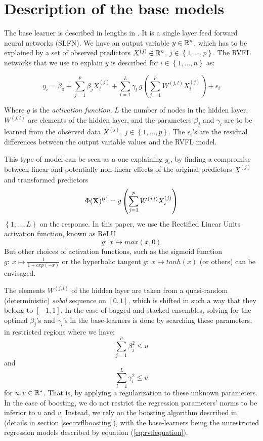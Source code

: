 \section{Description of the base models}
\label{sec:basemodeldesc}

The base learner is described in lengths in \cite{moudiki2018multiple}. It is a single layer feed forward neural networks (SLFN). We have an output variable $y \in \mathbb{R}^n$, which has to be explained by a set of observed predictors $X^{(j)} \in \mathbb{R}^n$, $j \in \left\lbrace 1, \ldots,
p\right\rbrace$. The RVFL networks that we use to explain $y$ is described for $i \in \left\lbrace 1, \ldots, n\right\rbrace$ as:

\begin{equation}
\label{eq:rvflequation}
y_i = \beta_0 + \sum_{j = 1}^p \beta_j X_i^{(j)} + \sum_{l = 1}^L \gamma_l \:
g\left(\sum_{j = 1}^p W^{(j, l)} X_i^{(j)}\right) + \epsilon_i
\end{equation}

\medskip

Where $g$ is the \textit{activation function}, $L$ the number of nodes in the hidden
layer, $W^{(j, l)}$ are elements of the hidden layer, and the parameters
$\beta_j$ and $\gamma_l$ are to be learned from the observed data $X^{(j)}, \: j
\in \left\lbrace 1, \ldots, p\right\rbrace$. The $\epsilon_i$'s are the residual
differences between the output variable values and the RVFL model.

\medskip

This type of model can be seen as a one explaining $y_i$, by finding a
compromise between linear and potentially non-linear effects of the original
predictors $X^{(j)}$ and transformed predictors
$$
\Phi({\bf X})^{(l)}= g\left(\sum_{j = 1}^p W^{(j, l)} X_i^{(j)}\right)
$$
$\left \lbrace 1, \ldots, L\right\rbrace$ on the response. In this paper, we use the Rectified Linear Units activation function, known as ReLU
$$
g: \: x \mapsto max(x, 0)
$$
But other choices of activation functions, such as the sigmoid function $g: \: x \mapsto \frac{1}{1+exp(-x)}$ or the hyperbolic tangent $g: \: x \mapsto tanh(x)$ (or others) can be envisaged.

\medskip

The elements $W^{(j, l)}$ of the hidden layer are taken from a quasi-random (deterministic) \textit{sobol} sequence on $[0, 1]$, which is shifted in such a way that they belong to $[-1, 1]$. In the case of bagged and stacked ensembles, solving for the optimal $\beta_j$'s and $\gamma_l$'s in the base-learners is done by searching these parameters,  in restricted regions where we have:
$$
\sum_{j=1}^p \beta_j^2  \leq u
$$
and
$$
\sum_{l=1}^L
\gamma_l^2 \leq v
$$ for $u, v \in \mathbb{R}^*$. That is, by applying a regularization to these unknown parameters. In the case of boosting, we do not restrict the regression parameters' norms to be inferior to $u$ and $v$. Instead, we rely on the boosting algorithm described in \cite{hothorn2010model} (details in section \ref{sec:rvflboosting}), with the base-learners being the unrestricted regression models described by equation (\ref{eq:rvflequation}).


